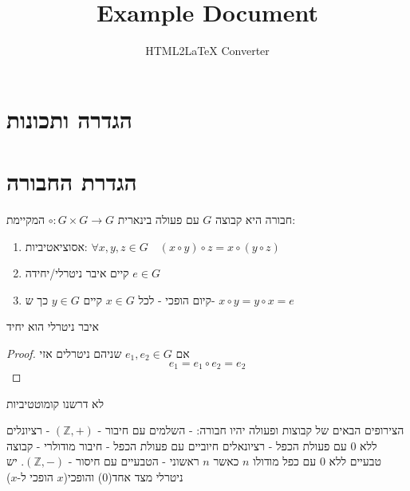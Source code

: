 \documentclass{tstextbook}
\begin{document}
\title{Example Document}
\author{HTML2LaTeX Converter}
\maketitle


\section{הגדרה ותכונות}

\section{הגדרת החבורה}

\begin{definition}[חבורה]
חבורה היא קבוצה \(G\) עם פעולה בינארית \(\circ:G\times G\to G\)  המקיימת:

  \begin{enumerate}
    \item אסוציאטיביות: \(\forall x,y,z\in G\quad(x\circ y)\circ z=x\circ(y\circ z)\)


    \item קיים איבר ניטרלי/יחידה \(e\in G\)


    \item קיום הופכי - לכל \(x \in G\) קיים \(y\in G\) כך ש- \(x\circ y=y\circ x=e\)


  \end{enumerate}
\end{definition}
\begin{lemma}
איבר ניטרלי הוא יחיד

\end{lemma}
\begin{proof}
אם \(e_{1},e_{2}\in G\) שניהם ניטרלים אזי
$$e_{1}=e_{1}\circ e_{2}=e_{2}$$

\end{proof}
\begin{remark}
לא דרשנו קומוטטיביות

\end{remark}
\begin{example}
הצירופים הבאים של קבוצות ופעולה יהיו חבורה:
- השלמים עם חיבור - \((\mathbb{Z},+)\)
- רציונלים ללא 0 עם פעולת הכפל
- רציונאלים חיוביים עם פעולת הכפל
- חיבור מודולרי
- קבוצה טבעיים ללא 0 עם כפל מודולו \(n\) כאשר \(n\) ראשוני
- הטבעיים עם חיסור - \((\mathbb{Z},-)\). יש ניטרלי מצד אחד(0) והופכי(\(x\) הופכי ל-\(x\))

\end{example}
\end{document}
